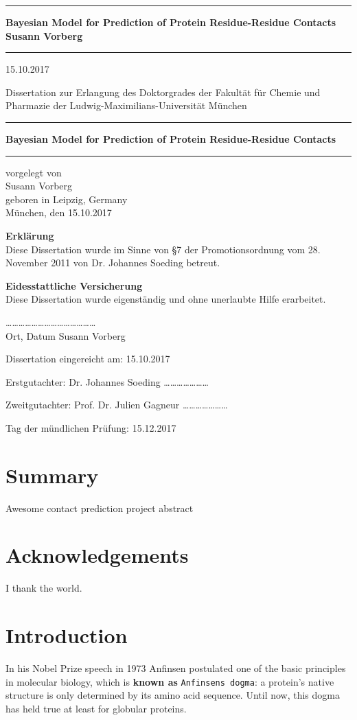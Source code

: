 \documentclass[12pt,a4paper,twoside]{book}
\newcommand{\LMUCover}[3]{
    \thispagestyle{empty}
    {\parindent0cm \rule{\linewidth}{.7ex}}
    
    \begin{flushright}
      \vspace*{\stretch{1}}
      \sffamily\bfseries\Huge
      #1\\
      \vspace*{\stretch{1}}
      \sffamily\bfseries\large
      #2
      \vspace*{\stretch{1}}
    \end{flushright}
  
    \rule{\linewidth}{.7ex}
    \vspace*{\stretch{5}}
    \vspace*{\stretch{1}}
    
    \begin{center}\sffamily\LARGE{#3}\end{center}
}
\newcommand{\LMUTitlePage}[4]{
    \thispagestyle{empty}
    \vspace*{\stretch{1}}
    
    \begin{center}
      \Large Dissertation zur Erlangung des Doktorgrades der Fakultät für Chemie und Pharmazie der Ludwig-Maximilians-Universität München
    \end{center}
    
    \vspace*{\stretch{1}}
    {\parindent0cm \rule{\linewidth}{.7ex}}
    
    \begin{flushright}
      \vspace*{\stretch{1}}
      \sffamily\bfseries\Huge
      #1\\
      \vspace*{\stretch{1}}
    \end{flushright}
  
    \rule{\linewidth}{.7ex}

    \vspace*{\stretch{3}}
    \begin{center}
      \Large vorgelegt von\\
      \Large #2\\
      \Large geboren in #3\\
      \vspace*{\stretch{2}}
      \Large München, den #4
    \end{center}
}
\newcommand{\LMUErklaerung}[5]{
    \thispagestyle{empty}
    \begin{flushleft}
      \large \textbf{Erklärung} \\[1mm]
      \large Diese Dissertation wurde im Sinne von §7 der Promotionsordnung vom 28. November 2011 von #2 betreut.
      \bigskip
  
      \large \textbf{Eidesstattliche Versicherung}\\[1mm]
      \large Diese Dissertation wurde eigenständig und ohne unerlaubte Hilfe erarbeitet.
      \vspace{5em}
  
      \dots\dots\dots   \dots\dots\dots \hfill \dots\dots\dots\dots\dots\dots\dots\dots\\
      \large Ort, Datum \hfill #1
      \vfill
  
  
      \large Dissertation eingereicht am: \hfill #4
      \bigskip
    
      \large Erstgutachter:  #2 \hfill \dots\dots\dots\dots\dots\dots\dots
      \bigskip
    
      \large Zweitgutachter: #3 \hfill \dots\dots\dots\dots\dots\dots\dots
      \bigskip
    
      \large Tag der mündlichen Prüfung: \hfill #5
    \end{flushleft}
}
\begin{document}
\frontmatter

\LMUCover
	{Bayesian Model for Prediction of Protein Residue-Residue Contacts}
	{Susann Vorberg}
	{15.10.2017}

\newpage
\thispagestyle{empty}
\cleardoublepage

\LMUTitlePage
	{Bayesian Model for Prediction of Protein Residue-Residue Contacts}
	{Susann Vorberg}
	{Leipzig, Germany}
	{15.10.2017}

\newpage
\thispagestyle{empty}
\cleardoublepage

\frontmatter\setcounter{page}{1}
\LMUErklaerung
	{Susann Vorberg}
	{Dr. Johannes Soeding}
	{Prof. Dr. Julien Gagneur}
	{15.10.2017}
	{15.12.2017}

\newpage
\thispagestyle{empty}
\cleardoublepage


\chapter{Summary}\label{summary}

Awesome contact prediction project abstract

\chapter{Acknowledgements}\label{acknowledgements}

I thank the world.

\tableofcontents

\listoffigures
{}

\listoftables
{}

\mainmatter \setcounter{page}{1}

\chapter{Introduction}\label{introduction}

In his Nobel Prize speech in 1973 \citep{Anfinsen1973} Anfinsen
postulated one of the basic principles in molecular biology, which is
\textbf{known as} \texttt{Anfinsen\textquotesingle{}s\ dogma}: a
protein's native structure is only determined by its amino acid
sequence. Until now, this dogma has held true at least for globular
proteins.
\end{document}
